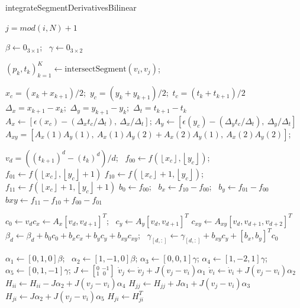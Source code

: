 \documentclass[11pt]{article}
\begin{document}
      
\begin{algorithm}[ht!]
\caption{integrateSegmentDerivativesBilinear}
\label{alg:integrateSegmentDerivativesBilinear}




{
 $j=mod(i,N)+1$\;

 $\beta \leftarrow 0_{3 \times 1}$;~
 $\gamma \leftarrow 0_{3 \times 2}$

$(p_k,t_k)_{k=1}^K\leftarrow\text{intersectSegment}(v_i,v_j)$;

{
$x_c=(x_k+x_{k+1})/2$;~$y_c=(y_k+y_{k+1})/2$;~$t_c=(t_k+t_{k+1})/2$\;
$\Delta_x=x_{k+1}-x_{k}$;~$\Delta_y=y_{k+1}-y_{k}$;~$\Delta_t=t_{k+1}-t_{k}$\;
$A_x \leftarrow [\epsilon(x_c)-(\Delta_x t_c/\Delta_t),~\Delta_x/\Delta_t]$; 
$A_y \leftarrow [\epsilon(y_c)-(\Delta_y t_c/\Delta_t),~\Delta_y/\Delta_t]$\; 
$A_{xy}=[A_x(1)A_y(1),~A_x(1)A_y(2)+A_x(2)A_y(1),~A_x(2)A_y(2)]$;

{    $v_d=((t_{k+1})^d-(t_{k})^d)/d$;~
}
$f_{00}\leftarrow f(\left\lfloor x_c\right\rfloor,\left\lfloor y_c\right\rfloor)$;~
$f_{01}\leftarrow f(\left\lfloor x_c\right\rfloor,\left\lfloor y_c\right\rfloor+1)$\;
$f_{10}\leftarrow f(\left\lfloor x_c\right\rfloor+1,\left\lfloor y_c\right\rfloor)$;~
 $f_{11}\leftarrow f(\left\lfloor x_c\right\rfloor+1,\left\lfloor y_c\right\rfloor+1)$\;
 $b_0 \leftarrow f_{00}$;~  
 $b_x \leftarrow f_{10}-f_{00}$;~
 $b_y \leftarrow f_{01}-f_{00}$\;
 $b{xy} \leftarrow f_{11}-f_{10}+f_{00}-f_{01}$\;
 
{
$c_0 \leftarrow v_d$\;$c_x \leftarrow A_x[v_d,v_{d+1}]^T$;~
$c_y \leftarrow A_y[v_d,v_{d+1}]^T$\;
$c_{xy} \leftarrow A_{xy}[v_d,v_{d+1},v_{d+2}]^T$\;
$\beta_d \leftarrow \beta_d + b_0 c_0+b_x c_x+b_y c_y+b_{xy}c_{xy}$;~
$\gamma_{[d,:]} \leftarrow \gamma_{[d,:]}  +b_{xy}c_y + [b_x,b_y]^T c_0$\;
}
}
 $\alpha_1 \leftarrow [0,1,0] \beta$;~
 $\alpha_2 \leftarrow [1,-1,0]\beta $; 
 $\alpha_3 \leftarrow [0,0,1] \gamma$;
 $\alpha_4 \leftarrow [1,-2,1]\gamma$;
 $\alpha_5 \leftarrow [0,1,-1]\gamma$; 
$J\leftarrow \left[^0_1~^{-1}_{~0}\right]$\;  
$\dot{v}_j \leftarrow \dot{v}_j  + J(v_j-v_i) \alpha_1$\;
$\dot{v}_i \leftarrow  \dot{v}_i + J(v_j-v_i) \alpha_2$\;         
 $H_{ii} \leftarrow  H_{ii} -J \alpha_2+J (v_j-v_i) \alpha_4$\; 
 $H_{jj} \leftarrow  H_{jj} +J \alpha_1+J (v_j-v_i) \alpha_3$\;
 $H_{ji} \leftarrow J \alpha_2+J (v_j-v_i) \alpha_5$\;
 $H_{ji} \leftarrow H_{ji}^T$\;
}
\end{algorithm}
 
\newpage
\newpage

{\small


}
\end{document}
